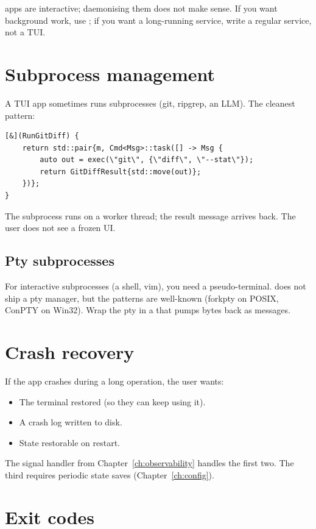 \maya{} apps are interactive; daemonising them does not make
sense. If you want background work, use ; if
you want a long-running service, write a regular service, not
a TUI.

\section{Subprocess management}

A TUI app sometimes runs subprocesses (git, ripgrep, an LLM).
The cleanest pattern:

\begin{lstlisting}
[&](RunGitDiff) {
    return std::pair{m, Cmd<Msg>::task([] -> Msg {
        auto out = exec(\"git\", {\"diff\", \"--stat\"});
        return GitDiffResult{std::move(out)};
    })};
}
\end{lstlisting}

The subprocess runs on a worker thread; the result message
arrives back. The user does not see a frozen UI.

\subsection*{Pty subprocesses}

For interactive subprocesses (a shell, vim), you need a
pseudo-terminal. \maya{} does not ship a pty manager, but the
patterns are well-known (forkpty on POSIX, ConPTY on Win32).
Wrap the pty in a  that pumps bytes back as
messages.

\section{Crash recovery}

If the app crashes during a long operation, the user wants:

\begin{itemize}[leftmargin=*]
  \item The terminal restored (so they can keep using it).
  \item A crash log written to disk.
  \item State restorable on restart.
\end{itemize}

The signal handler from Chapter~\ref{ch:observability} handles
the first two. The third requires periodic state saves
(Chapter~\ref{ch:config}).

\section{Exit codes}

